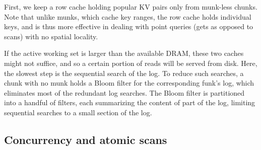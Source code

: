 \documentclass[sigplan,10pt]{acmart}
\begin{document}
First, we keep a row cache holding popular KV pairs only from munk-less chunks. Note that unlike munks, which cache key ranges, the row
cache holds individual keys, and is thus more effective in dealing with point queries (gets as opposed to scans) with no
spatial locality.

If the active working set is larger than the available DRAM, these two caches might not suffice, and so a certain portion of reads 
will be served from disk. Here, the slowest step is the sequential search of the {log}. 
To reduce such searches, a chunk with no munk holds a Bloom filter for the corresponding funk's {log}, 
which eliminates most of the redundant log searches.
The Bloom filter is partitioned into a  handful of filters, each summarizing the 
content of part of the {log}, limiting  sequential  searches to a small section of the log.

 

 \subsection{Concurrency and atomic scans}
\label{ssec:scans}
\end{document}
